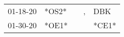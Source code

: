 \begin{supertabular}{lllll}
 01-18-20 &  *OS2* &   &  , &    DBK \\
 01-30-20 &  *OE1* &   &    &  *CE1* \\
\end{supertabular}
